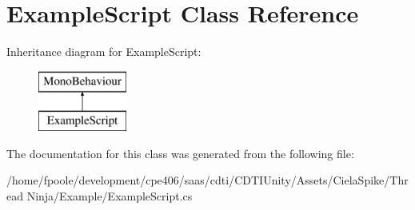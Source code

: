 \hypertarget{class_example_script}{}\section{Example\+Script Class Reference}
\label{class_example_script}
Inheritance diagram for Example\+Script\+:\begin{figure}[H]
\begin{center}
\leavevmode
\includegraphics[height=2.000000cm]{class_example_script}
\end{center}
\end{figure}


The documentation for this class was generated from the following file\+:\begin{DoxyCompactItemize}
\item 
/home/fpoole/development/cpe406/saas/cdti/\+C\+D\+T\+I\+Unity/\+Assets/\+Ciela\+Spike/\+Thread Ninja/\+Example/Example\+Script.\+cs\end{DoxyCompactItemize}
